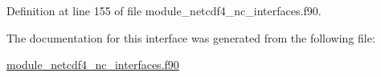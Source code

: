 Definition at line 155 of file module\+\_\+netcdf4\+\_\+nc\+\_\+interfaces.\+f90.



The documentation for this interface was generated from the following file\+:\begin{DoxyCompactItemize}
\item 
\hyperlink{module__netcdf4__nc__interfaces_8f90}{module\+\_\+netcdf4\+\_\+nc\+\_\+interfaces.\+f90}\end{DoxyCompactItemize}
